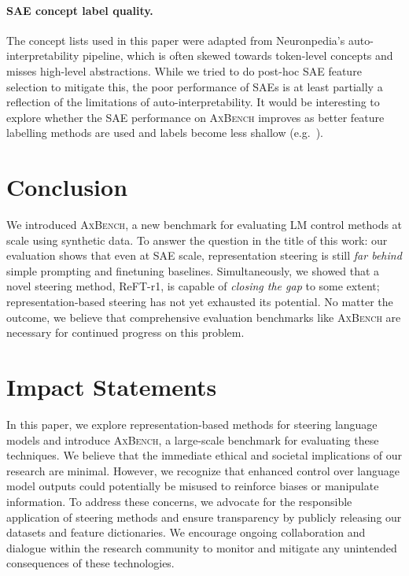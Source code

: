 \documentclass{article}
\theoremstyle{plain}
\theoremstyle{definition}
\theoremstyle{remark}
\newcommand{\shortbenchmark}{\textsc{AxBench}}
\begin{document}

\paragraph{SAE concept label quality.} The concept lists used in this paper were adapted from Neuronpedia's auto-interpretability pipeline, which is often skewed towards token-level concepts and misses high-level abstractions. While we tried to do post-hoc SAE feature selection to mitigate this, the poor performance of SAEs is at least partially a reflection of the limitations of auto-interpretability. It would be interesting to explore whether the SAE performance on \shortbenchmark{} improves as better feature labelling methods are used and labels become less shallow (e.g.~\citealp{choi2024automatic}).

\section{Conclusion}
We introduced \shortbenchmark{}, a new benchmark for evaluating LM control methods at scale using synthetic data. To answer the question in the title of this work: our evaluation shows that even at SAE scale, representation steering is still \textit{far behind} simple prompting and finetuning baselines. Simultaneously, we showed that a novel steering method, ReFT-r1, is capable of \textit{closing the gap} to some extent; representation-based steering has not yet exhausted its potential. No matter the outcome, we believe that comprehensive evaluation benchmarks like \shortbenchmark{} are necessary for continued progress on this problem.

\section*{Impact Statements}

In this paper, we explore representation-based methods for steering language models and introduce \shortbenchmark{}, a large-scale benchmark for evaluating these techniques. We believe that the immediate ethical and societal implications of our research are minimal. However, we recognize that enhanced control over language model outputs could potentially be misused to reinforce biases or manipulate information. To address these concerns, we advocate for the responsible application of steering methods and ensure transparency by publicly releasing our datasets and feature dictionaries. We encourage ongoing collaboration and dialogue within the research community to monitor and mitigate any unintended consequences of these technologies.
\end{document}
